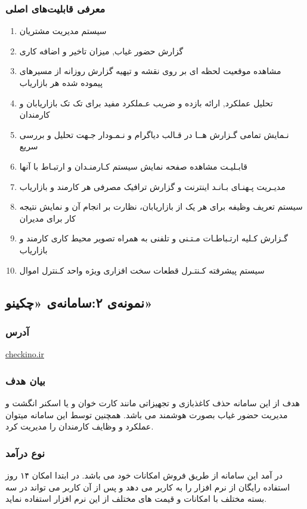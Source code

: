 \subsubsection{معرفی قابلیت‌های اصلی}

\begin{enumerate}
\item
 سیستم مدیریت مشتریان
\item
  گزارش حضور غیاب, میزان تاخیر و اضافه کاری
  \item
   مشاهده موقعیت لحظه ای بر روی نقشه و تیهیه گزارش روزانه از مسیرهای پیموده شده هر بازاریاب
   \item
    تحلیل عملکرد, ارائه بازده و ضریب عـملکرد مفید براى تک تک بازاریابان و کارمندان
    \item
     نـمایش تمامی گـزارش هــا در قـالب دیاگرام و نـمـودار جـهت تحلیل و بررسى سریع 
     \item
      قابـلیـت مشاهده صفحه نمایش سیستم کـارمنـدان و ارتبـاط با آنها 
      \item
       مدیـریت پـهنـاى بـانـد اینترنت و گزارش ترافیک مصرفى هر کارمند و بازاریاب
       \item
        سیستم تعریف وظیفه برای هر یک از بازاریابان، نظارت بر انجام آن و نمایش نتیجه کار برای مدیران
        \item
         گـزارش کـلیه ارتـباطـات مـتـنى و تلفنى به همراه تصویر محیط کارى کارمند و بازاریاب
         \item
          سیستم پیشرفته کـنتـرل قطعات سخت افزارى ویژه واحد کـنترل اموال


\end{enumerate}
\subsection{نمونه‌ی ۲:‌سامانه‌ی «چکینو»}

\subsubsection{آدرس}
 \url{checkino.ir}

\subsubsection{بیان هدف}
هدف از این سامانه حذف کاغذبازی و تجهیزاتی مانند کارت خوان و یا اسکنر انگشت و مدیریت حضور غیاب بصورت هوشمند می باشد. همچنین توسط این سامانه میتوان عملکرد و وظایف کارمندان را مدیریت کرد.

\subsubsection{نوع درآمد}
در آمد این سامانه از طریق فروش امکانات خود می باشد. در ابتدا امکان ۱۴ روز استفاده رایگان از نرم افزار را به کاربر می دهد و پس از آن کاربر می تواند در سه بسته مختلف با امکانات و قیمت های مختلف از این نرم افزار استفاده نماید.

